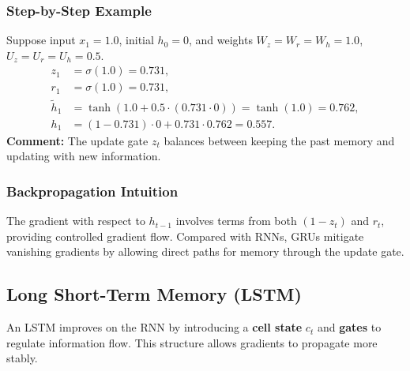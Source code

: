 \documentclass[11pt]{article}
\theoremstyle{remark}
\begin{document}
\subsubsection*{Step-by-Step Example}
Suppose input $x_1=1.0$, initial $h_0=0$, and weights $W_z=W_r=W_h=1.0$, $U_z=U_r=U_h=0.5$.
\begin{align*}
    z_1 &= \sigma(1.0) = 0.731, \\
    r_1 &= \sigma(1.0) = 0.731, \\
    \tilde{h}_1 &= \tanh(1.0 + 0.5 \cdot (0.731 \cdot 0)) = \tanh(1.0) = 0.762, \\
    h_1 &= (1-0.731)\cdot 0 + 0.731\cdot 0.762 = 0.557.
\end{align*}
\noindent \textbf{Comment:} The update gate $z_t$ balances between keeping the past memory and updating with new information.

\subsubsection*{Backpropagation Intuition}
The gradient with respect to $h_{t-1}$ involves terms from both $(1-z_t)$ and $r_t$, providing controlled gradient flow. Compared with RNNs, GRUs mitigate vanishing gradients by allowing direct paths for memory through the update gate.

\subsection{Long Short-Term Memory (LSTM)}
An LSTM improves on the RNN by introducing a \textbf{cell state} $c_t$ and \textbf{gates} to regulate information flow. This structure allows gradients to propagate more stably.
\end{document}
